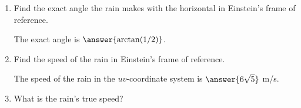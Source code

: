 \documentclass{ximera}
\begin{document}
\begin{question}
\begin{enumerate}
\item Find the exact angle the rain makes with the horizontal in Einstein's frame of reference.

The exact angle is $\answer{\arctan(1/2)}$.


\item Find the speed of the rain in Einstein's frame of reference.

The speed of the rain in the $uv$-coordinate system is $\answer{6\sqrt{5}}$ m/s.

\item What is the rain's true speed?
\begin{freeResponse}
\end{freeResponse}

\end{enumerate}

\end{question}
\end{document}
